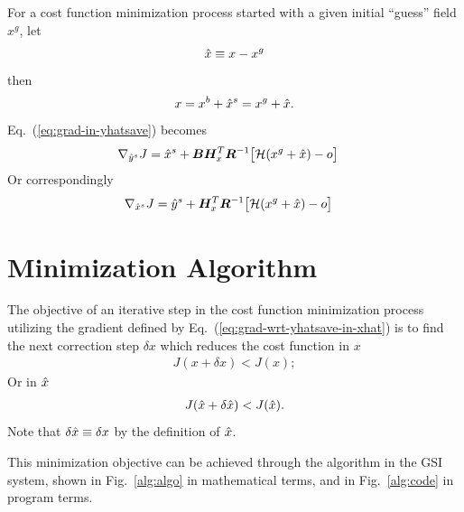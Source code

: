 \documentclass{article}
\begin{document}
For a cost function minimization process started with a given initial
``guess'' field $x^g$, let
\begin{gather}
\label{eq:xhat}
  {\hat{x}} \equiv x - x^g
\end{gather}
then
\begin{align*}
  x = x^b + {{\hat{x}}^s} = x^g + {\hat{x}}.
\end{align*}
Eq.~(\ref{eq:grad-in-yhatsave}) becomes
\begin{align}
\label{eq:grad-wrt-yhatsave-in-xhat}
  \nabla_{{\hat{y}}^s} J
    &=	{{\hat{x}}^s} +
	\bm B\bm H_x^T \bm R^{-1}
	\bigl[ {\mathcal H}(x^g+{\hat{x}}) - o \bigr]
\end{align}
Or correspondingly
\begin{align}
\label{eq:grad-wrt-xhatsave-in-xhat}
  \nabla_{{\hat{x}}^s} J
    &=	{{\hat{y}}^s} +
	\bm H_x^T \bm R^{-1}
	\bigl[ {\mathcal H}(x^g+{\hat{x}}) - o \bigr]
\end{align}


\section{Minimization Algorithm}

The objective of an iterative step in the cost function minimization
process utilizing the gradient defined by
Eq.~(\ref{eq:grad-wrt-yhatsave-in-xhat})
is to find the next correction step $\delta x$ which reduces
the cost function in $x$
\begin{align*}
  J(x+\delta x) < J(x);
\end{align*}
Or in ${\hat{x}}$
\begin{align*}
  J({\hat{x}}+\delta{\hat{x}}) < J({\hat{x}}).
\end{align*}
Note that $\delta{\hat{x}} \equiv \delta x$ by the definition of ${\hat{x}}$.

This minimization objective can be achieved through the
algorithm in the GSI system, shown in Fig.~\ref{alg:algo} in
mathematical terms, and in Fig.~\ref{alg:code} in
program terms.
\end{document}
